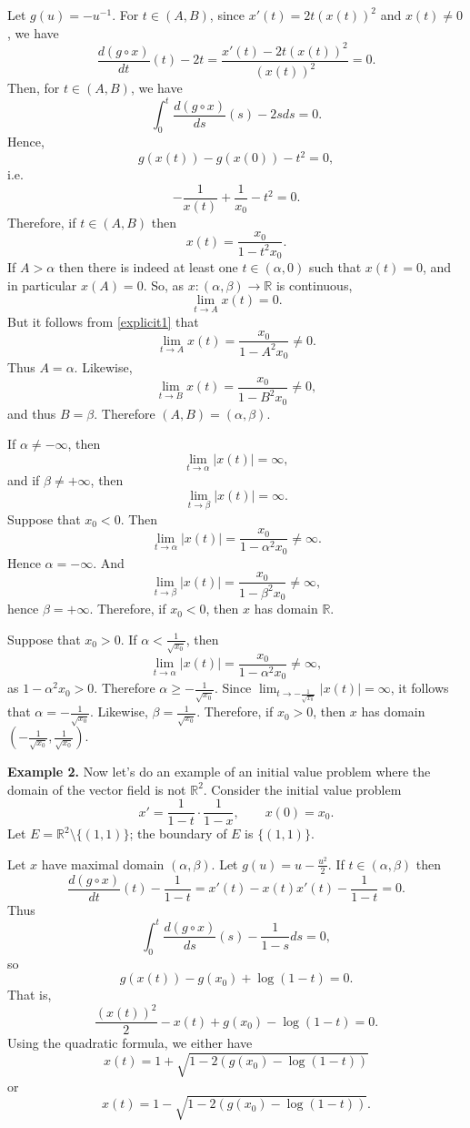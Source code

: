 \documentclass{article}
\theoremstyle{definition}
\begin{document}
Let $g(u)=-u^{-1}$.
For $t \in (A,B)$, since $x'(t)=2t (x(t))^2$ and $x(t) \neq 0$, we have
\[
\frac{d (g \circ x)}{dt}(t)-2t=\frac{x'(t)-2t(x(t))^2}{(x(t))^2}=0.
\]
Then, for $t \in (A,B)$, we have
\[
\int_0^t \frac{d (g \circ x)}{ds}(s)-2s ds = 0.
\]
Hence,
\[
g(x(t))-g(x(0))-t^2=0,
\]
i.e.
\[
-\frac{1}{x(t)}+\frac{1}{x_0}-t^2=0.
\]
Therefore, if $t \in (A,B)$ then
\begin{equation}
x(t)=\frac{x_0}{1-t^2x_0}.
\label{explicit1}
\end{equation}
If $A > \alpha$ then there is indeed at least one $t \in (\alpha,0)$ such that $x(t)=0$, and in particular $x(A)=0$. So, as $x:(\alpha,\beta) \to \mathbb{R}$ is continuous,
\[
\lim_{t \to A} x(t) = 0.
\]
But it follows from \eqref{explicit1} that
\[
\lim_{t \to A} x(t) = \frac{x_0}{1-A^2 x_0} \neq 0.
\]
Thus $A = \alpha$. Likewise, 
\[
\lim_{t \to B} x(t) = \frac{x_0}{1-B^2 x_0} \neq 0,
\]
and thus $B=\beta$. Therefore $(A,B)=(\alpha,\beta)$. 

If $\alpha \neq -\infty$, then 
\[
\lim_{t \to \alpha} |x(t)| = \infty,
\]
and if $\beta \neq +\infty$, then
\[
\lim_{t \to \beta} |x(t)| = \infty.
\]
Suppose that $x_0<0$. Then
\[
\lim_{t \to \alpha} |x(t)| = \frac{x_0}{1-\alpha^2 x_0} \neq \infty.
\]
Hence $\alpha=-\infty$. And 
\[
\lim_{t \to \beta} |x(t)| = \frac{x_0}{1-\beta^2 x_0} \neq \infty,
\]
hence $\beta=+\infty$. Therefore, if $x_0<0$, then $x$ has domain $\mathbb{R}$.

Suppose that $x_0>0$. If $\alpha < \frac{1}{\sqrt{x_0}}$, then
\[
\lim_{t \to \alpha} |x(t)| = \frac{x_0}{1-\alpha^2 x_0} \neq \infty,
\]
as $1-\alpha^2 x_0>0$. Therefore $\alpha \geq -\frac{1}{\sqrt{x_0}}$. Since $\lim_{t \to  -\frac{1}{\sqrt{x_0}}}  |x(t)|=\infty$, it follows that
$\alpha=-\frac{1}{\sqrt{x_0}}$. Likewise,
$\beta=\frac{1}{\sqrt{x_0}}$. Therefore, if $x_0>0$, then $x$ has domain $\left(- \frac{1}{\sqrt{x_0}},\frac{1}{\sqrt{x_0}} \right)$.


\textbf{Example 2.} Now let's do an example of an initial value problem where the domain of the vector field is not $\mathbb{R}^2$. 
Consider the initial value problem
\[
x'=\frac{1}{1-t}\cdot \frac{1}{1-x}, \qquad x(0)=x_0.
\]
Let $E=\mathbb{R}^2 \setminus \{(1,1)\}$; the boundary of $E$ is $\{(1,1)\}$. 

Let $x$ have maximal domain $(\alpha,\beta)$. Let $g(u)=u-\frac{u^2}{2}$. If $t \in (\alpha,\beta)$ then
\[
\frac{d (g \circ x)}{dt}(t)-\frac{1}{1-t}=x'(t)-x(t)x'(t)-\frac{1}{1-t}=0.
\]
Thus
\[
\int_0^t \frac{d (g \circ x)}{ds}(s)-\frac{1}{1-s} ds=0,
\]
so
\[
g(x(t))-g(x_0)+\log(1-t)=0.
\]
That is,
\[
\frac{(x(t))^2}{2}-x(t)+g(x_0)-\log(1-t)=0.
\]
Using the quadratic formula, we either have
\[
x(t)=1+\sqrt{1-2(g(x_0)-\log(1-t))}
\]
or
\[
x(t)=1-\sqrt{1-2(g(x_0)-\log(1-t))}.
\]
\end{document}
